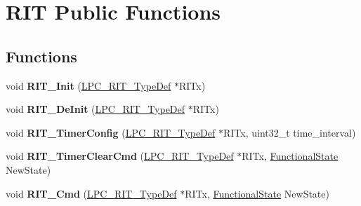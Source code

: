 \hypertarget{group___r_i_t___public___functions}{\section{\-R\-I\-T \-Public \-Functions}
\label{group___r_i_t___public___functions}
}
\subsection*{\-Functions}
\begin{DoxyCompactItemize}
\item 
\hypertarget{group___r_i_t___public___functions_ga49fd553a6045b459915b065bd80b7717}{void {\bfseries \-R\-I\-T\-\_\-\-Init} (\hyperlink{struct_l_p_c___r_i_t___type_def}{\-L\-P\-C\-\_\-\-R\-I\-T\-\_\-\-Type\-Def} $\ast$\-R\-I\-Tx)}\label{group___r_i_t___public___functions_ga49fd553a6045b459915b065bd80b7717}

\item 
\hypertarget{group___r_i_t___public___functions_ga7fca236ef8f2657d4246804d290f2eeb}{void {\bfseries \-R\-I\-T\-\_\-\-De\-Init} (\hyperlink{struct_l_p_c___r_i_t___type_def}{\-L\-P\-C\-\_\-\-R\-I\-T\-\_\-\-Type\-Def} $\ast$\-R\-I\-Tx)}\label{group___r_i_t___public___functions_ga7fca236ef8f2657d4246804d290f2eeb}

\item 
\hypertarget{group___r_i_t___public___functions_ga7a27ef27998a008d6ee5e48ab97e16ca}{void {\bfseries \-R\-I\-T\-\_\-\-Timer\-Config} (\hyperlink{struct_l_p_c___r_i_t___type_def}{\-L\-P\-C\-\_\-\-R\-I\-T\-\_\-\-Type\-Def} $\ast$\-R\-I\-Tx, uint32\-\_\-t time\-\_\-interval)}\label{group___r_i_t___public___functions_ga7a27ef27998a008d6ee5e48ab97e16ca}

\item 
\hypertarget{group___r_i_t___public___functions_ga785e528948db336d779c5d11453cf5af}{void {\bfseries \-R\-I\-T\-\_\-\-Timer\-Clear\-Cmd} (\hyperlink{struct_l_p_c___r_i_t___type_def}{\-L\-P\-C\-\_\-\-R\-I\-T\-\_\-\-Type\-Def} $\ast$\-R\-I\-Tx, \hyperlink{group___l_p_c___types___public___types_gac9a7e9a35d2513ec15c3b537aaa4fba1}{\-Functional\-State} \-New\-State)}\label{group___r_i_t___public___functions_ga785e528948db336d779c5d11453cf5af}

\item 
\hypertarget{group___r_i_t___public___functions_gac3d6781229efc851e8bf33f22a9e7a9f}{void {\bfseries \-R\-I\-T\-\_\-\-Cmd} (\hyperlink{struct_l_p_c___r_i_t___type_def}{\-L\-P\-C\-\_\-\-R\-I\-T\-\_\-\-Type\-Def} $\ast$\-R\-I\-Tx, \hyperlink{group___l_p_c___types___public___types_gac9a7e9a35d2513ec15c3b537aaa4fba1}{\-Functional\-State} \-New\-State)}\label{group___r_i_t___public___functions_gac3d6781229efc851e8bf33f22a9e7a9f}


\end{DoxyCompactItemize}
